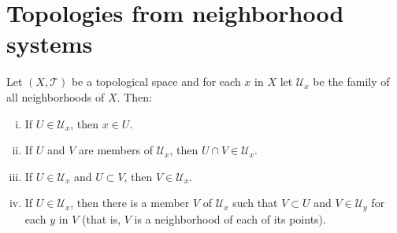 \section{Topologies from neighborhood systems}

\begin{problem}
  Let $(X,\mathcal{T})$ be a topological space and for each $x$ in $X$ let
  $\mathcal{U}_{x}$ be the family of all neighborhoods of $X$. Then:
  \begin{enumerate}[(i)]
    \item
      If $U\in{\mathcal{U}_{x}}$, then $x\in{U}$.
    \item
      If $U$ and $V$ are members of $\mathcal{U}_{x}$, then
      $U\cap{V}\in{\mathcal{U}_{x}}$.
    \item
      If $U\in{\mathcal{U}_{x}}$ and $U\subset{V}$, then
      $V\in{\mathcal{U}_{x}}$.
    \item
      If $U\in{\mathcal{U}_{x}}$, then there is a member $V$ of
      $\mathcal{U}_{x}$ such that $V\subset{U}$ and $V\in{\mathcal{U}_{y}}$ for
      each $y$ in $V$ (that is, $V$ is a neighborhood of each of its points).
  \end{enumerate}
\end{problem} 
